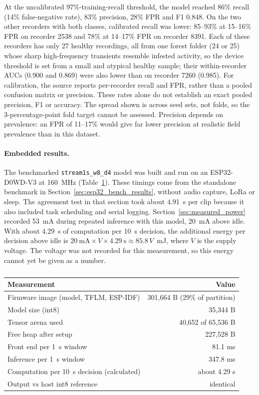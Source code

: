 At the uncalibrated 97\%-training-recall threshold, the model reached 86\% recall (14\% false-negative rate), 83\% precision, 28\% FPR and F1 0.848. On the two other recorders with both classes, calibrated recall was lower: 85--93\% at 15--16\% FPR on recorder 2538 and 78\% at 14--17\% FPR on recorder 8391. Each of these recorders has only 27 healthy recordings, all from one forest folder (24 or 25) whose sharp high-frequency transients resemble infested activity, so the device threshold is set from a small and atypical healthy sample; their within-recorder AUCs (0.900 and 0.869) were also lower than on recorder 7260 (0.985). For calibration, the source reports per-recorder recall and FPR, rather than a pooled confusion matrix or precision. These rates alone do not establish an exact pooled precision, F1 or accuracy. The spread shown is across seed sets, not folds, so the 3-percentage-point fold target cannot be assessed. Precision depends on prevalence: an FPR of 11--17\% would give far lower precision at realistic field prevalence than in this dataset.

\paragraph{Embedded results.} The benchmarked \texttt{stream1s\_w8\_d4} model was built and run on an ESP32-D0WD-V3 at 160~MHz (Table~\ref{tab:ml_embedded}). These timings come from the standalone benchmark in Section~\ref{sec:esp32_bench_results}, without audio capture, LoRa or sleep. The agreement test in that section took about 4.91~s per clip because it also included task scheduling and serial logging. Section~\ref{sec:measured_power} recorded 53~mA during repeated inference with this model, 20~mA above idle. With about 4.29~s of computation per 10~s decision, the additional energy per decision above idle is $20~\mathrm{mA}\times V\times4.29~\mathrm{s}\approx 85.8\,V$~mJ, where $V$ is the supply voltage. The voltage was not recorded for this measurement, so this energy cannot yet be given as a number.

\begin{table}[htbp]
\centering
\color{black}
\small
\caption{}
\label{tab:ml_embedded}
\begin{tabular}{lr}
\toprule
Measurement & Value \\
\midrule
Firmware image (model, TFLM, ESP-IDF) & 301,664 B (29\% of partition) \\
Model size (int8) & 35,344 B \\
Tensor arena used & 40,652 of 65,536 B \\
Free heap after setup & 227,528 B \\
Front end per 1~s window & 81.1 ms \\
Inference per 1~s window & 347.8 ms \\
Computation per 10~s decision (calculated) & about 4.29 s \\
Output vs host int8 reference & identical \\
\bottomrule
\end{tabular}
\end{table}


